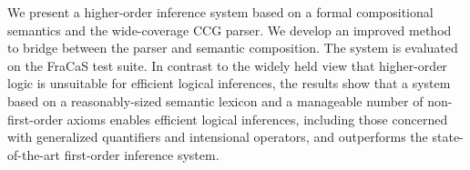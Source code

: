 We present a higher-order inference system based on a formal compositional semantics and the wide-coverage CCG parser. We develop an improved method to bridge between the parser and semantic composition. The system is evaluated on the FraCaS test suite. In contrast to the widely held view that higher-order logic is unsuitable for efficient logical inferences, the results show that a system based on a reasonably-sized semantic lexicon and a manageable number of non-first-order axioms enables efficient logical inferences, including those concerned with generalized quantifiers and intensional operators, and outperforms the state-of-the-art first-order inference system.
